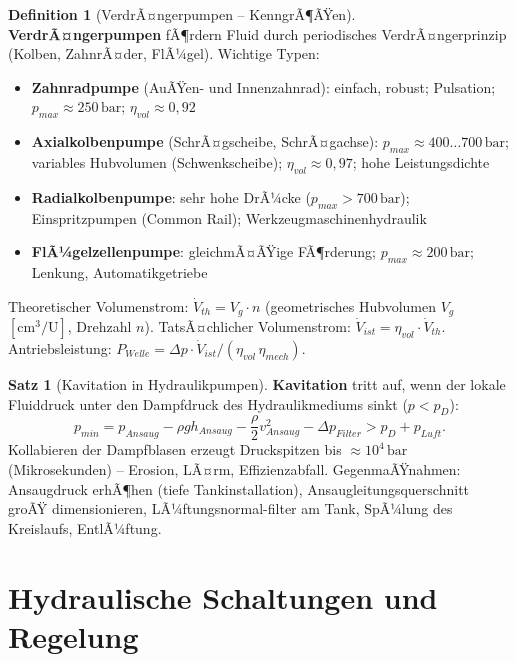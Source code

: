 ﻿\documentclass[a4paper,12pt]{report}
\theoremstyle{definition}
\newtheorem{definition}{Definition}
\newtheorem{satz}{Satz}
\begin{document}
\begin{definition}[VerdrÃ¤ngerpumpen -- KenngrÃ¶ÃŸen]
\textbf{VerdrÃ¤ngerpumpen} fÃ¶rdern Fluid durch periodisches VerdrÃ¤ngerprinzip
(Kolben, ZahnrÃ¤der, FlÃ¼gel). Wichtige Typen:
\begin{itemize}
    \item[-] \textbf{Zahnradpumpe} (AuÃŸen- und Innenzahnrad): einfach, robust;
          Pulsation; $p_{max} \approx 250\,\mathrm{bar}$; $\eta_{vol} \approx 0{,}92$
    \item[-] \textbf{Axialkolbenpumpe} (SchrÃ¤gscheibe, SchrÃ¤gachse):
          $p_{max} \approx 400\ldots700\,\mathrm{bar}$; variables Hubvolumen (Schwenkscheibe);
          $\eta_{vol} \approx 0{,}97$; hohe Leistungsdichte
    \item[-] \textbf{Radialkolbenpumpe}: sehr hohe DrÃ¼cke ($p_{max} > 700\,\mathrm{bar}$);
          Einspritzpumpen (Common Rail); Werkzeugmaschinenhydraulik
    \item[-] \textbf{FlÃ¼gelzellenpumpe}: gleichmÃ¤ÃŸige FÃ¶rderung; $p_{max} \approx 200\,\mathrm{bar}$;
          Lenkung, Automatikgetriebe
\end{itemize}
Theoretischer Volumenstrom: $\dot{V}_{th} = V_g \cdot n$ (geometrisches Hubvolumen $V_g$
$[\mathrm{cm^3/U}]$, Drehzahl $n$).
TatsÃ¤chlicher Volumenstrom: $\dot{V}_{ist} = \eta_{vol} \cdot \dot{V}_{th}$.
Antriebsleistung: $P_{Welle} = \Delta p \cdot \dot{V}_{ist} / (\eta_{vol}\,\eta_{mech})$.
\end{definition}

\begin{satz}[Kavitation in Hydraulikpumpen]
\textbf{Kavitation} tritt auf, wenn der lokale Fluiddruck unter den
Dampfdruck des Hydraulikmediums sinkt ($p < p_D$):
\[
  p_{min} = p_{Ansaug} - \rho g h_{Ansaug} - \frac{\rho}{2}v_{Ansaug}^2 - \Delta p_{Filter} > p_D + p_{Luft}.
\]
Kollabieren der Dampfblasen erzeugt Druckspitzen bis $\approx 10^4\,\mathrm{bar}$
(Mikrosekunden) -- Erosion, LÃ¤rm, Effizienzabfall.
GegenmaÃŸnahmen: Ansaugdruck erhÃ¶hen (tiefe Tankinstallation),
Ansaugleitungsquerschnitt groÃŸ dimensionieren, LÃ¼ftungsnormal-filter am Tank,
SpÃ¼lung des Kreislaufs, EntlÃ¼ftung.
\end{satz}

\section{Hydraulische Schaltungen und Regelung}
\end{document}

